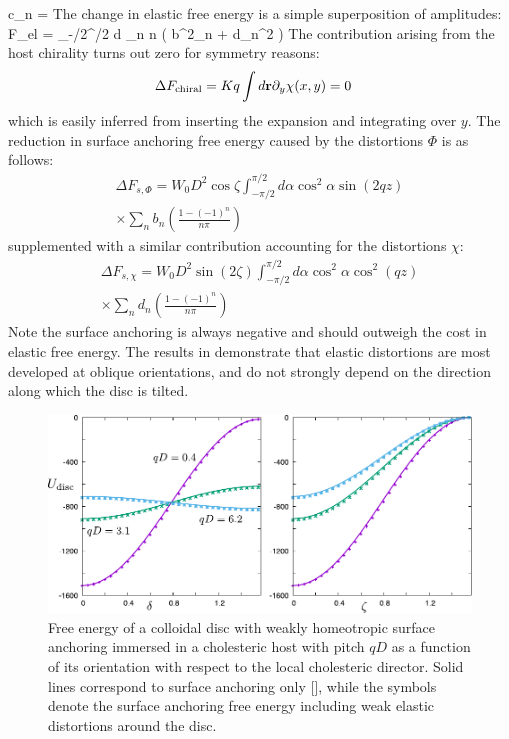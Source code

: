\beq
c_{n} = 
\eeq
The change in elastic free energy is a simple superposition of amplitudes:
\beq
\Delta F_{el} =   \int_{-\pi/2}^{\pi/2} d \alpha \cos \alpha \sum_{n} n \left ( b^{2}_{n} + d_{n}^{2} \right )
\eeq
The contribution arising from the host chirality turns out zero for symmetry reasons:
\begin{align}
 \Delta F_{\rm chiral} &=  K q \int d {\bf r} \partial_{y} \chi (x,y) =0
\end{align}
which is easily inferred from inserting the expansion  and integrating over $y$.
The reduction in surface anchoring free energy caused by the distortions  $\Phi$ is as follows:
\begin{align}
\Delta F_{s, \Phi} = W_{0}D^{2} \cos \zeta  \int_{-\pi/2}^{\pi/2} d \alpha \cos^{2} \alpha \sin (2 qz) \nonumber \\
\times \sum_{n} b_{n} \left ( \frac{1-(-1)^{n}}{n \pi}\right )
\end{align}
supplemented with a similar contribution accounting for the distortions $\chi$:
\begin{align}
\Delta F_{s, \chi} = W_{0}D^{2} \sin( 2 \zeta ) \int_{-\pi/2}^{\pi/2} d \alpha \cos^{2} \alpha  \cos^{2} (qz) \nonumber \\
\times \sum_{n} d_{n} \left ( \frac{1-(-1)^{n}}{n \pi}\right )
\end{align}
Note the surface anchoring is always negative and should outweigh the cost in elastic free energy. The results in  demonstrate that elastic distortions are most developed at oblique orientations, and do not strongly depend on the direction along which the disc is tilted.

\begin{figure}
	\includegraphics[width = \columnwidth]{figures/chapter-4/udisc}
	\caption{Free energy of a colloidal disc with weakly homeotropic surface anchoring immersed in a cholesteric host with pitch $qD$ as a function of its orientation with respect to the local cholesteric director.  Solid lines correspond to surface anchoring only  [], while the symbols denote the surface anchoring free energy including weak elastic distortions around the disc.  }
	\label{udisc}
\end{figure}

